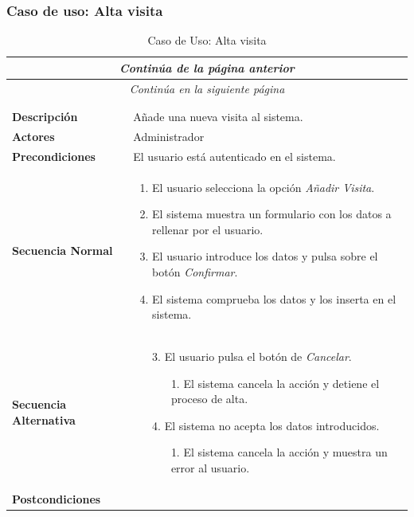 \subsubsection*{Caso de uso: Alta visita }
\begin{longtable}{| p{4cm} | p{10cm} |}
\endfirsthead
\multicolumn{2}{c}{\textit{Continúa de la página anterior}}\\[12pt]
\hline
\endhead
\hline
\multicolumn{2}{c}{\textit{Continúa en la siguiente página}} \\
\endfoot
\hline
\caption{Caso de Uso: Alta visita}\label{fig:1}\\
\endlastfoot


\hline
\multicolumn{2}{|c|}{\textbf{CU$<$31$>$ - Alta Visita}} \\

\hline
\textbf{Descripción} &
Añade una nueva visita al sistema.\\

\hline
\textbf{Actores} &
Administrador\\

\hline
\textbf{Precondiciones} &
El usuario está autenticado en el sistema.\\

\hline
\textbf{Secuencia Normal} &\mbox{}\par\vspace{-\baselineskip}
\begin{enumerate}[leftmargin=0.7cm, topsep=0.1cm]
\item El usuario selecciona la opción \textit{Añadir Visita}.
\item El sistema muestra un formulario con los datos a rellenar por el usuario.
\item El usuario introduce los datos y pulsa sobre el botón \textit{Confirmar}.
\item El sistema comprueba los datos y los inserta en el sistema.
\end{enumerate}


\\
\hline
\textbf{Secuencia Alternativa} &\mbox{}\par\vspace{-\baselineskip}
\begin{enumerate}[leftmargin=0.9cm, topsep=0.1cm]
\item[3.] El usuario pulsa el botón de \textit{Cancelar}.
	\begin{itemize}
	\item[1.] El sistema cancela la acción y detiene el proceso de alta.
	\end{itemize}
\item[4.] El sistema no acepta los datos introducidos.
	\begin{itemize}
	\item[1.] El sistema cancela la acción y muestra un error al usuario.
	\end{itemize}
\end{enumerate}
\\

\hline
\textbf{Postcondiciones} & \\
\hline
\end{longtable}



